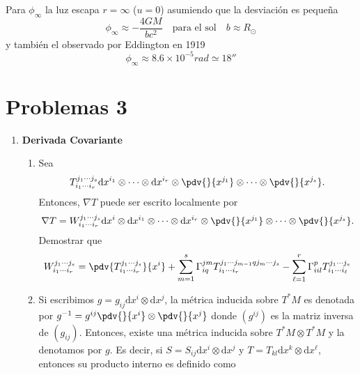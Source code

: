 \documentclass[../main]{subfiles}
\begin{document}
Para $\phi_{\infty}$ la luz escapa $r=\infty$ ($u=0$) asumiendo que la desviación es pequeña 
\begin{equation}
    \phi_{\infty}\approx -\dfrac{4GM}{bc^2} \quad \text{para el sol} \quad b\approx R_{\odot}
\end{equation}
y también el observado por Eddington en 1919
\begin{equation}
    \phi_{\infty}\approx 8.6\times 10^{-5}rad \simeq 18''
\end{equation}

\section*{Problemas 3}

\begin{enumerate}
    \item \textbf{Derivada Covariante}
    \begin{enumerate}[label=(\alph*)]
        \item Sea 
        \begin{equation}
            T^{j_1 \cdots j_s}_{i_1 \cdots i_r}\mathrm{d}x^{i_1} \otimes \cdots \otimes \mathrm{d}x^{i_r}\otimes \pdv{}{x^{j_1}} \otimes \cdots \otimes \pdv{}{x^{j_s}}. 
        \end{equation}
        Entonces, $\nabla T$ puede ser escrito localmente por 
        \begin{equation}
            \nabla T=W^{j_1 \cdots j_s}_{i_1 \cdots i_r} \mathrm{d}x^{i} \otimes \mathrm{d}x^{i_1} \otimes \cdots \otimes \mathrm{d}x^{i_r} \otimes \pdv{}{x^{j_1}} \otimes \cdots \otimes \pdv{}{x^{j_s}}.
        \end{equation}
        Demostrar que 
        \begin{equation}
            W^{j_1 \cdots j_s}_{i_1 \cdots i_r}=\pdv{T^{j_1 \cdots j_s}_{i_1 \cdots i_r}}{x^{i}}+\sum_{m=1}^s \Gamma^{jm}_{iq} T^{j_1 \cdots j_{m-1}qj_m \cdots j_s}_{i_1 \cdots i_r}-\sum_{\ell=1}^r \Gamma^{p}_{iil}T^{j_1 \cdots j_s}_{i_1 \cdots i_{\ell}}
        \end{equation}
        \item Si escribimos $g=g_{ij}\mathrm{d}x^{i}\otimes \mathrm{d}x^{j}$, la métrica inducida sobre $T^* M$ es denotada por $g^{-1}=g^{ij}\pdv{}{x^{i}}\otimes \pdv{}{x^{j}}$ donde $(g^{ij})$ es la matriz inversa de $(g_{ij})$. Entonces, existe una métrica inducida sobre $T^* M\otimes T^* M$ y la denotamos por $g$. Es decir, si $S=S_{ij}\mathrm{d}x^{i}\otimes \mathrm{d}x^{j}$ y $T=T_{kl}\mathrm{d}x^k \otimes \mathrm{d}x^{\ell}$, entonces su producto interno es definido como 

\end{enumerate}
\end{enumerate}
\end{document}
